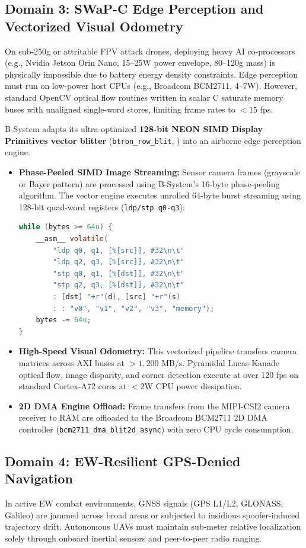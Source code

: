 \documentclass[10pt,journal,compsoc,twocolumn]{article}
\begin{document}
\subsection{Domain 3: SWaP-C Edge Perception and Vectorized Visual Odometry}
On sub-250g or attritable FPV attack drones, deploying heavy AI co-processors (e.g., Nvidia Jetson Orin Nano, 15--25W power envelope, 80--120g mass) is physically impossible due to battery energy density constraints. Edge perception must run on low-power host CPUs (e.g., Broadcom BCM2711, 4--7W). However, standard OpenCV optical flow routines written in scalar C saturate memory buses with unaligned single-word stores, limiting frame rates to $<15$ fps.

B-System adapts its ultra-optimized \textbf{128-bit NEON SIMD Display Primitives vector blitter} (\texttt{btron\_row\_blit}, ) into an airborne edge perception engine:
\begin{itemize}[leftmargin=*]
    \item \textbf{Phase-Peeled SIMD Image Streaming:} Sensor camera frames (grayscale or Bayer pattern) are processed using B-System's 16-byte phase-peeling algorithm. The vector engine executes unrolled 64-byte burst streaming using 128-bit quad-word registers (\texttt{ldp/stp q0-q3}):
    \begin{lstlisting}[language=C]
while (bytes >= 64u) {
    __asm__ volatile(
        "ldp q0, q1, [%[src]], #32\n\t"
        "ldp q2, q3, [%[src]], #32\n\t"
        "stp q0, q1, [%[dst]], #32\n\t"
        "stp q2, q3, [%[dst]], #32\n\t"
        : [dst] "+r"(d), [src] "+r"(s)
        : : "v0", "v1", "v2", "v3", "memory");
    bytes -= 64u;
}
    \end{lstlisting}
    \item \textbf{High-Speed Visual Odometry:} This vectorized pipeline transfers camera matrices across AXI buses at $>1{,}200$ MB/s. Pyramidal Lucas-Kanade optical flow, image disparity, and corner detection execute at over 120 fps on standard Cortex-A72 cores at $<2$W CPU power dissipation.
    \item \textbf{2D DMA Engine Offload:} Frame transfers from the MIPI-CSI2 camera receiver to RAM are offloaded to the Broadcom BCM2711 2D DMA controller (\texttt{bcm2711\_dma\_blit2d\_async}) with zero CPU cycle consumption.
\end{itemize}

\subsection{Domain 4: EW-Resilient GPS-Denied Navigation}
In active EW combat environments, GNSS signals (GPS L1/L2, GLONASS, Galileo) are jammed across broad areas or subjected to insidious spoofer-induced trajectory drift. Autonomous UAVs must maintain sub-meter relative localization solely through onboard inertial sensors and peer-to-peer radio ranging.
\end{document}
